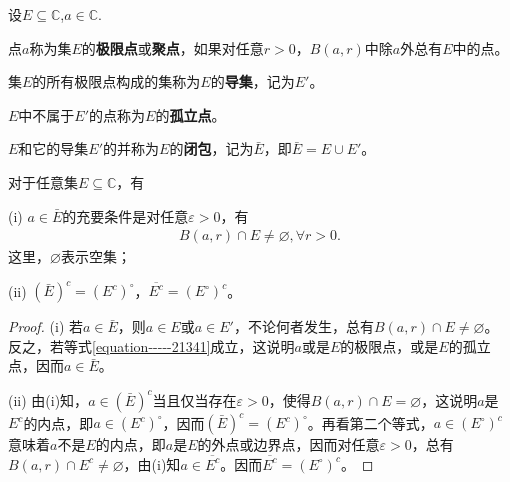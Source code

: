 \documentclass[../../main.tex]{subfiles}%
\begin{document}
\begin{definition}
设$E\subseteq \mathbb{C}$,$a\in \mathbb{C}$.

点\(a\)称为集\(E\)的\textbf{极限点}或\textbf{聚点}，如果对任意\(r > 0\)，\(B(a, r)\)中除\(a\)外总有\(E\)中的点。

集\(E\)的所有极限点构成的集称为\(E\)的\textbf{导集}，记为\(E'\)。

\(E\)中不属于\(E'\)的点称为\(E\)的\textbf{孤立点}。

\(E\)和它的导集\(E'\)的并称为\(E\)的\textbf{闭包}，记为\(\bar{E}\)，即\(\bar{E} = E \cup E'\)。
\end{definition}

\begin{proposition}\label{proposition:闭包的性质}
对于任意集\(E\subseteq \mathbb{C}\)，有

(i) \(a \in \bar{E}\)的充要条件是对任意\(\varepsilon > 0\)，有
\begin{align}
B(a, r) \cap E \neq \varnothing,\forall r>0.\label{equation-----21341}
\end{align}
这里，\(\varnothing\)表示空集；

(ii) \((\bar{E})^c = (E^c)^\circ\)，\(\overline{E^c} = (E^\circ)^c\)。
\end{proposition}
\begin{proof}
(i) 若\(a \in \bar{E}\)，则\(a \in E\)或\(a \in E'\)，不论何者发生，总有\(B(a, r) \cap E \neq \varnothing\)。反之，若等式\eqref{equation-----21341}成立，这说明\(a\)或是\(E\)的极限点，或是\(E\)的孤立点，因而\(a \in \bar{E}\)。

(ii) 由(i)知，\(a \in (\bar{E})^c\)当且仅当存在\(\varepsilon > 0\)，使得\(B(a, r) \cap E = \varnothing\)，这说明\(a\)是\(E^c\)的内点，即\(a \in (E^c)^\circ\)，因而\((\bar{E})^c = (E^c)^\circ\)。再看第二个等式，\(a \in (E^\circ)^c\)意味着\(a\)不是\(E\)的内点，即\(a\)是\(E\)的外点或边界点，因而对任意\(\varepsilon > 0\)，总有\(B(a, r) \cap E^c \neq \varnothing\)，由(i)知\(a \in \overline{E^c}\)。因而\(\overline{E^c} = (E^\circ)^c\)。 
\end{proof}
\end{document}
